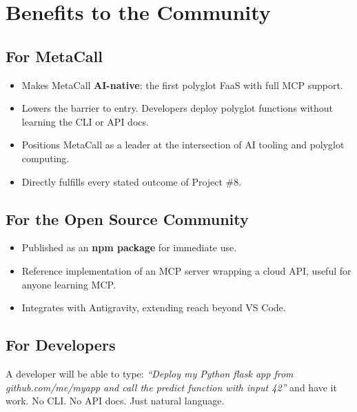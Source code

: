 \documentclass[12pt, a4paper]{article}
\begin{document}
\clearpage
\section{Benefits to the Community}

\subsection{For MetaCall}

\begin{itemize}[leftmargin=1.5em, itemsep=3pt]
  \item Makes MetaCall \textbf{AI-native}: the first polyglot FaaS
        with full MCP support.
  \item Lowers the barrier to entry. Developers deploy polyglot
        functions without learning the CLI or API docs.
  \item Positions MetaCall as a leader at the intersection of AI
        tooling and polyglot computing.
  \item Directly fulfills every stated outcome of Project \#8.
\end{itemize}

\subsection{For the Open Source Community}

\begin{itemize}[leftmargin=1.5em, itemsep=3pt]
  \item Published as an \textbf{npm package} for immediate use.
  \item Reference implementation of an MCP server wrapping a cloud
        API, useful for anyone learning MCP.
  \item Integrates with Antigravity, extending reach beyond VS Code.
\end{itemize}

\subsection{For Developers}

A developer will be able to type:
\emph{``Deploy my Python flask app from github.com/me/myapp and call
the predict function with input 42''}
and have it work. No CLI. No API docs. Just natural language.


\end{document}

